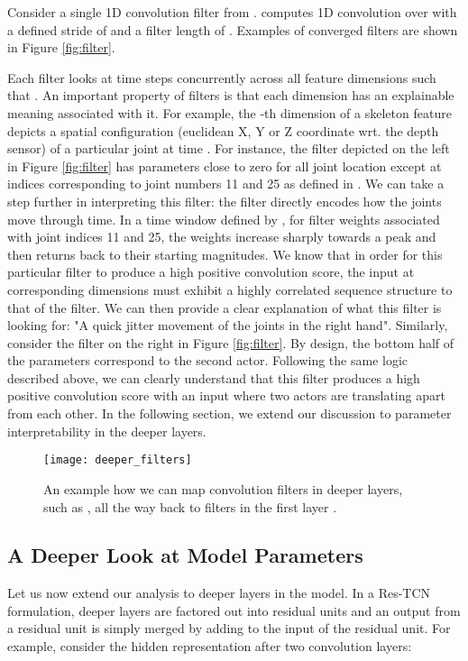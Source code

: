 \documentclass[10pt,twocolumn,letterpaper]{article}
\begin{document}
Consider a single 1D convolution filter  from .  computes 1D convolution over  with a defined stride of  and a filter length of . Examples of converged filters are shown in Figure \ref{fig:filter}.

Each filter looks at  time steps concurrently across all feature dimensions such that . An important property of  filters is that each dimension  has an explainable meaning associated with it. For example, the -th dimension of a skeleton feature  depicts a spatial configuration (euclidean X, Y or Z coordinate wrt. the depth sensor) of a particular joint at time . For instance, the filter depicted on the left in Figure \ref{fig:filter} has parameters close to zero for all joint location except at indices corresponding to joint numbers 11 and 25 as defined in \cite{nturgdb2016}. We can take a step further in interpreting this filter: the filter directly encodes how the joints move through time. In a time window defined by , for filter weights associated with joint indices 11 and 25, the weights increase sharply towards a peak and then returns back to their starting magnitudes. We know that in order for this particular filter to produce a high positive convolution score, the input  at corresponding dimensions must exhibit a highly correlated sequence structure to that of the filter. We can then provide a clear explanation of what this filter is looking for: "A quick jitter movement of the joints in the right hand". Similarly, consider the filter on the right in Figure \ref{fig:filter}. By design, the bottom half of the parameters correspond to the second actor. Following the same logic described above, we can clearly understand that this filter produces a high positive convolution score with an input where two actors are translating apart from each other. In the following section, we extend our discussion to parameter interpretability in the deeper layers.


\begin{figure}[t]
\begin{center}
 \texttt{[image: deeper\_filters]}
\end{center}
 \caption{An example how we can map convolution filters in deeper layers, such as , all the way back to filters in the first layer .}
\label{fig:deep_filter}
\end{figure}

\subsection{A Deeper Look at Model Parameters}
\label{section:deeper}
Let us now extend our analysis to deeper layers in the model. In a Res-TCN formulation, deeper layers are factored out into residual units and an output from a residual unit is simply merged by adding to the input of the residual unit. For example, consider the hidden representation after two convolution layers:
\end{document}

